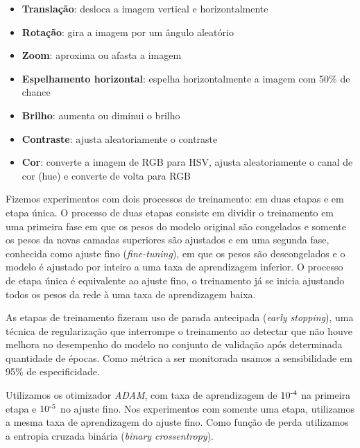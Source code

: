 \documentclass[12pt]{article}
\begin{document}
\begin{itemize}[noitemsep]
    \item \textbf{Translação}: desloca a imagem vertical e horizontalmente
    \item \textbf{Rotação}: gira a imagem por um ângulo aleatório
    \item \textbf{Zoom}: aproxima ou afasta a imagem
    \item \textbf{Espelhamento horizontal}: espelha horizontalmente a imagem com 50\% de chance
    \item \textbf{Brilho}: aumenta ou diminui o brilho
    \item \textbf{Contraste}: ajusta aleatoriamente o contraste
    \item \textbf{Cor}: converte a imagem de RGB para HSV, ajusta aleatoriamente o canal de cor (hue) e converte de volta para RGB
\end{itemize}

Fizemos experimentos com dois processos de treinamento: em duas etapas e em etapa única. O processo de duas etapas consiste em dividir o treinamento em uma primeira fase em que os pesos do modelo original são congelados e somente os pesos da novas camadas superiores são ajustados e em uma segunda fase, conhecida como ajuste fino (\emph{fine-tuning}), em que os pesos são descongelados e o modelo é ajustado por inteiro a uma taxa de aprendizagem inferior. O processo de etapa única é equivalente ao ajuste fino, o treinamento já se inicia ajustando todos os pesos da rede à uma taxa de aprendizagem baixa.

As etapas de treinamento fizeram uso de parada antecipada (\emph{early stopping}), uma técnica de regularização que interrompe o treinamento ao detectar que não houve melhora no desempenho do modelo no conjunto de validação após determinada quantidade de épocas. Como métrica a ser monitorada usamos a sensibilidade em 95\% de especificidade.


Utilizamos os otimizador \emph{ADAM}, com taxa de aprendizagem de $10\textsuperscript{-4}$ na primeira etapa e $10\textsuperscript{-5}$ no ajuste fino. Nos experimentos com somente uma etapa, utilizamos a mesma taxa de aprendizagem do ajuste fino. Como função de perda utilizamos a entropia cruzada binária (\emph{binary crossentropy}).
\end{document}
